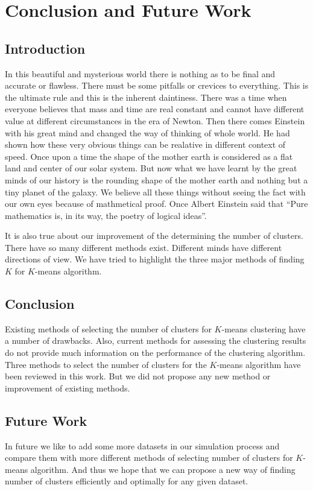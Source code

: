 \chapter{Conclusion and Future Work}\label{ch:conclusion}

\section{Introduction}
In this beautiful and mysterious world there is nothing as to be final and accurate or flawless.
There must be some pitfalls or crevices to everything. This is the ultimate rule and this is
the inherent daintiness. There was a time when everyone believes that mass and time are real
constant and cannot have different value at different circumstances in the era of Newton. Then
there comes Einstein with his great mind and changed the way of thinking of whole world. He
had shown how these very obvious things can be realative in different context of speed. Once
upon a time the shape of the mother earth is considered as a flat land and center of our solar
system. But now what we have learnt by the great minds of our history is the rounding shape of
the mother earth and nothing but a tiny planet of the galaxy. We believe all these things without
seeing the fact with our own eyes because of mathmetical proof. Once Albert Einstein said that
“Pure mathematics is, in its way, the poetry of logical ideas”.

It is also true about our improvement of the determining the number of clusters. There have so
many different methods exist. Different minds have different directions of view. We have
tried to highlight the three major methods of finding $K$ for $K$-means algorithm.

\section{Conclusion}
Existing methods of selecting the number of clusters for
$K$-means clustering have a number of drawbacks.
Also,  current  methods  for  assessing  the  clustering
results  do  not  provide   much  information   on  the
performance of the clustering algorithm.
Three  methods  to  select  the  number  of  clusters
for  the $K$-means  algorithm  have  been  reviewed  in
this work. But we did not propose any new method or improvement
of existing methods.

\section{Future Work}
In future we like to add some more datasets in our simulation process
and compare them with more different methods of selecting number of
clusters for $K$-means algorithm. And thus we hope that we can propose a new way of finding
number of clusters efficiently and optimally for any given dataset.

\endinput
